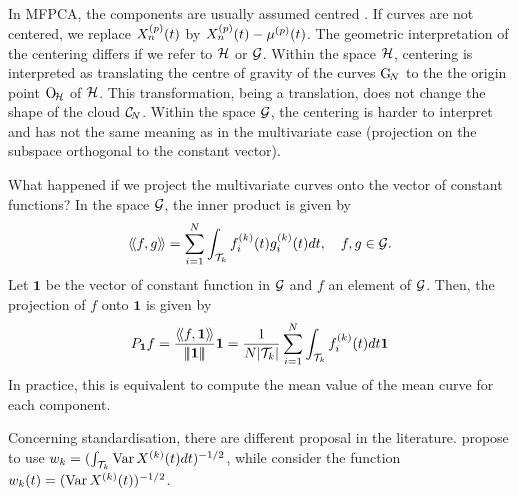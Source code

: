 In MFPCA, the components are usually assumed centred \cite{happMultivariateFunctionalPrincipal2015}. If curves are not centered, we replace $X_n^{(p)}(t)$ by $X_n^{(p)}(t) - \mu^{(p)}(t)$. The geometric interpretation of the centering differs if we refer to $\mathcal{H}$ or $\mathcal{G}$. Within the space $\mathcal{H}$, centering is interpreted as translating the centre of gravity of the curves $\mathrm{G}_{\!N}$ to the the origin point $\mathrm{O}_{\!\mathcal{H}}$ of $\mathcal{H}$. This transformation, being a translation, does not change the shape of the cloud $\mathcal{C}_{\!N}$. Within the space $\mathcal{G}$, the centering is harder to interpret and has not the same meaning as in the multivariate case (projection on the subspace orthogonal to the constant vector). 

\begin{remark}
What happened if we project the multivariate curves onto the vector of constant functions?
In the space $\mathcal{G}$, the inner product is given by
\begin{equation}
\langle\!\langle f, g\rangle\!\rangle = \sum_{i = 1}^N \int_{\mathcal{T}_{k}} f^{(k)}_i(t)g^{(k)}_i(t)dt, \quad f, g \in \mathcal{G}.
\end{equation} 
Let $\mathbf{1}$ be the vector of constant function in $\mathcal{G}$ and $f$ an element of $\mathcal{G}$. Then, the projection of $f$ onto $\mathbf{1}$ is given by
\begin{equation}
P_{\mathbf{1}}f = \frac{\langle\!\langle f, \mathbf{1}\rangle\!\rangle}{\left|\!\left|\!\left|\mathbf{1}\right|\!\right|\!\right|}\mathbf{1} = \frac{1}{N\lvert \mathcal{T}_{k} \rvert}\sum_{i = 1}^N \int_{\mathcal{T}_{k}} f^{(k)}_i(t)dt\mathbf{1}
\end{equation}
In practice, this is equivalent to compute the mean value of the mean curve for each component.
\end{remark}

Concerning standardisation, there are different proposal in the literature. \cite{happMultivariateFunctionalPrincipal2015} propose to use $w_k = (\int_{\mathcal{T}_{k}} \operatorname{Var} X^{(k)}(t)dt)^{-1/2}$, while \cite{chiouMultivariateFunctionalPrincipal2014} consider the function $w_k(t) = (\operatorname{Var} X^{(k)}(t))^{-1/2}$.


